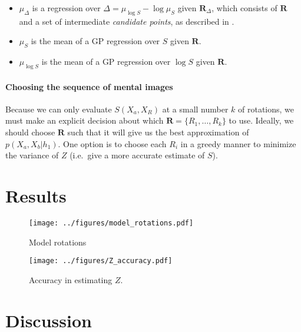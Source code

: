 \documentclass{article} %
\begin{document}
\begin{itemize}
\itemsep1pt\parskip0pt
\item $\mu_\Delta$ is a regression over $\Delta=\mu_{\log S} - \log
  \mu_S$ given $\mathbf{R}_\Delta$, which consists of $\mathbf{R}$ and
  a set of intermediate \emph{candidate points}, as described in
  \cite{Osborne:2012tm}.
\item $\mu_S$ is the mean of a GP regression over $S$ given
  $\mathbf{R}$.
\item $\mu_{\log S}$ is the mean of a GP regression over $\log S$
  given $\mathbf{R}$.
\end{itemize}

\paragraph{Choosing the sequence of mental images}

Because we can only evaluate $S(X_a, X_R)$ at a small number $k$ of
rotations, we must make an explicit decision about which
$\mathbf{R}=\{R_1, \ldots{}, R_k\}$ to use. Ideally, we should choose
$\mathbf{R}$ such that it will give us the best approximation of
$p(X_a, X_b\vert h_1)$. One option is to choose each $R_i$ in a greedy
manner to minimize the variance of $Z$ (i.e.~give a more accurate
estimate of $S$).

\section{Results}

\begin{figure}[t]
  \centering
  \texttt{[image: ../figures/model\_rotations.pdf]}
  \caption{Model rotations}
  \label{fig:rotations}
\end{figure}

\begin{figure}[t]
  \centering
  \texttt{[image: ../figures/Z\_accuracy.pdf]}
  \caption{Accuracy in estimating $Z$.}
  \label{fig:accuracy}
\end{figure}

\section{Discussion}


\renewcommand\refname{\normalsize{References}}


\end{document}

